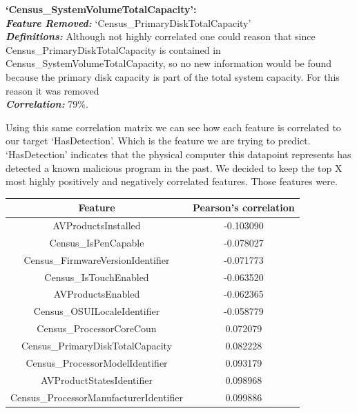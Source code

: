 \documentclass[sigconf]{acmart}
\begin{document}
\begin{center}
    \vspace{5mm}
\textbf{`Census\_SystemVolumeTotalCapacity':}\\
    \textbf{\textit{Feature Removed: }}`Census\_PrimaryDiskTotalCapacity'\\
    \textbf{\textit{Definitions:}} Although not highly correlated one could reason that since Census\_PrimaryDiskTotalCapacity  is contained in Census\_SystemVolumeTotalCapacity, so no new information would be found because the primary disk capacity is part of the total system capacity. For this reason it was removed\\
    \textbf{\textit{Correlation: }}79\%.\\
    \vspace{5mm}
\end{center}

Using this same correlation matrix we can see how each feature is correlated to our target `HasDetection'. Which is the feature we are trying to predict. `HasDetection' indicates that the physical computer this datapoint represents has detected a known malicious program in the past. We decided to keep the top X most highly positively and negatively correlated features. Those features were.

\begin{center}
\begin{tabular}{ |c|c| } 
 \hline
 Feature & Pearson's correlation \\
  \hline\hline
 AVProductsInstalled & -0.103090 \\
  \hline
Census\_IsPenCapable & -0.078027 \\
 \hline
Census\_FirmwareVersionIdentifier & -0.071773 \\
 \hline
Census\_IsTouchEnabled & -0.063520 \\
 \hline
AVProductsEnabled & -0.062365 \\
 \hline
Census\_OSUILocaleIdentifier & -0.058779 \\
 \hline
Census\_ProcessorCoreCoun & 0.072079 \\
 \hline
Census\_PrimaryDiskTotalCapacity & 0.082228 \\
 \hline
Census\_ProcessorModelIdentifier & 0.093179 \\
 \hline
AVProductStatesIdentifier & 0.098968 \\
 \hline
Census\_ProcessorManufacturerIdentifier & 0.099886 \\
 \hline
\end{tabular}
\end{center}
\vspace{3mm}
\end{document}
